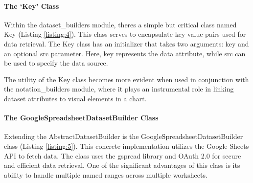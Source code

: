 \paragraph{The `Key' Class}\label{the-key-class}

Within the dataset\_builders module, there\textquotesingle s a simple
but critical class named Key (Listing \ref{listing:4}). This class serves to
encapsulate key-value pairs used for data retrieval. The Key class has
an initializer that takes two arguments: key and an optional src
parameter. Here, key represents the data attribute, while src can be
used to specify the data source.



The utility of the Key class becomes more evident when used in
conjunction with the notation\_builders module, where it plays an
instrumental role in linking dataset attributes to visual elements in a
chart.

\paragraph{The GoogleSpreadsheetDatasetBuilder
Class}\label{the-googlespreadsheetdatasetbuilder-class}

Extending the AbstractDatasetBuilder is the
GoogleSpreadsheetDatasetBuilder class (Listing \ref{listing:5}). This concrete
implementation utilizes the Google Sheets API to fetch data. The class
uses the gspread library and OAuth 2.0 for secure and efficient data
retrieval. One of the significant advantages of this class is its
ability to handle multiple named ranges across multiple worksheets.

